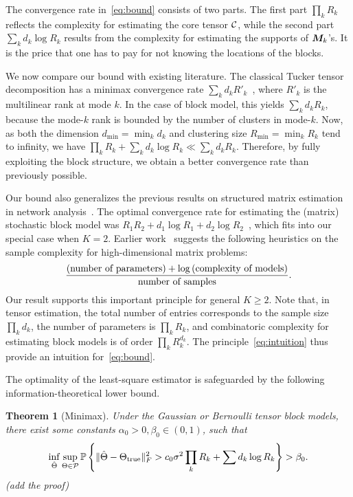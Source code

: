 \documentclass{article}
\newtheorem{theorem}{Theorem}
\begin{document}
The convergence rate in~\eqref{eq:bound} consists of two parts. The first part $\prod_k R_k$ reflects the complexity for estimating the core tensor $\mathcal{C}$, while the second part $\sum_k d_k \log R_k$ results from the complexity for estimating the supports of $\bm M_k$'s. It is the price that one has to pay for not knowing the locations of the blocks.  

We now compare our bound with existing literature. The classical Tucker tensor decomposition has a minimax convergence rate $\sum_kd_kR'_k$~\cite{zhang2018tensor}, where $R'_k$ is the multilinear rank at mode $k$. In the case of block model, this yields $\sum_kd_kR_k$, because the mode-$k$ rank is bounded by the number of clusters in mode-$k$. Now, as both the dimension $d_{\min}=\min_kd_k$ and clustering size $R_{\min}=\min_k R_k$ tend to infinity, we have $\prod_k R_k+ \sum_k d_k \log R_k\ll \sum_k d_k R_k$. Therefore, by fully exploiting the block structure, we obtain a better convergence rate than previously possible. 

Our bound also generalizes the previous results on structured matrix estimation in network analysis~\cite{gao2016optimal,gao2018minimax}. The optimal convergence rate for estimating the (matrix) stochastic block model was $R_1R_2+d_1\log R_1+d_2\log R_2$~\cite{gao2016optimal}, which fits into our special case when $K=2$. 
Earlier work~\cite{gao2018minimax} suggests the following heuristics on the sample complexity for high-dimensional matrix problems:
\begin{equation}\label{eq:intuition}
{\text{(number of parameters)}+ \log \text{(complexity of models)}\over \text{number of samples}}.
\end{equation}
Our result supports this important principle for general $K\geq 2$. Note that, in tensor estimation, the total number of entries corresponds to the sample size $\prod_k d_k$, the number of parameters is $\prod_k R_k$, and combinatoric complexity for estimating block models is of order $\prod_k R_k^{d_k}$. The principle~\eqref{eq:intuition} thus provide an intuition for~\eqref{eq:bound}. 

The optimality of the least-square estimator is safeguarded by the following information-theoretical lower bound.
\begin{theorem}[Minimax] Under the Gaussian or Bernoulli tensor block models, there exist some constants $\alpha_0>0, \beta_0\in(0,1)$, such that
\[
\inf_{\hat \Theta}\sup_{\Theta \in \mathcal{P}}\mathbb{P}\left\{ \lVert\hat \Theta-\Theta_{\text{true}}\rVert_F^2> c_0\sigma^2 \prod_k R_k+\sum d_k \log R_k\right\}>\beta_0.
\]
(add the proof)
\end{theorem}
\end{document}

